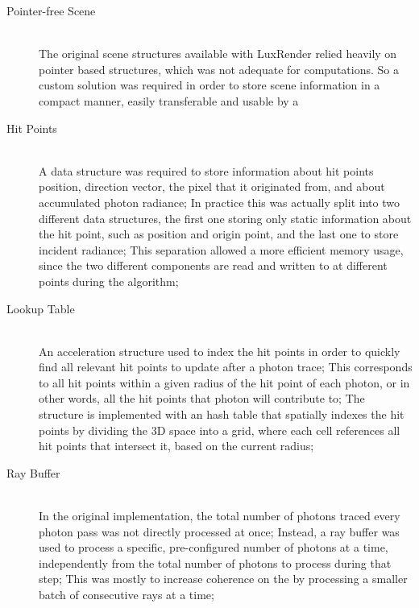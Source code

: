 \documentclass[main.tex]{subfiles}
\begin{document}
\begin{description}
\item[Pointer-free Scene] \hfill \\
  The original scene structures available with LuxRender relied heavily on pointer based structures, which was not adequate for \gpu computations. So a custom solution was required in order to store scene information in a compact manner, easily transferable and usable by a \gpu

\item[Hit Points] \hfill \\
  A data structure was required to store information about hit points position, direction vector, the pixel that it originated from, and about accumulated photon radiance; In practice this was actually split into two different data structures, the first one storing only static information about the hit point, such as position and origin point, and the last one to store incident radiance; This separation allowed a more efficient memory usage, since the two different components are read and written to at different points during the algorithm;

\item[Lookup Table] \hfill \\
  An acceleration structure used to index the hit points in order to quickly find all relevant hit points to update after a photon trace; This corresponds to all hit points within a given radius of the hit point of each photon, or in other words, all the hit points that photon will contribute to; The structure is implemented with an hash table that spatially indexes the hit points by dividing the 3D space into a grid, where each cell references all hit points that intersect it, based on the current radius;

\item[Ray Buffer] \hfill \\
  In the original implementation, the total number of photons traced every photon pass was not directly processed at once; Instead, a ray buffer was used to process a specific, pre-configured number of photons at a time, independently from the total number of photons to process during that step; This was mostly to increase coherence on the \cpu by processing a smaller batch of consecutive rays at a time;

\end{description}
\end{document}
